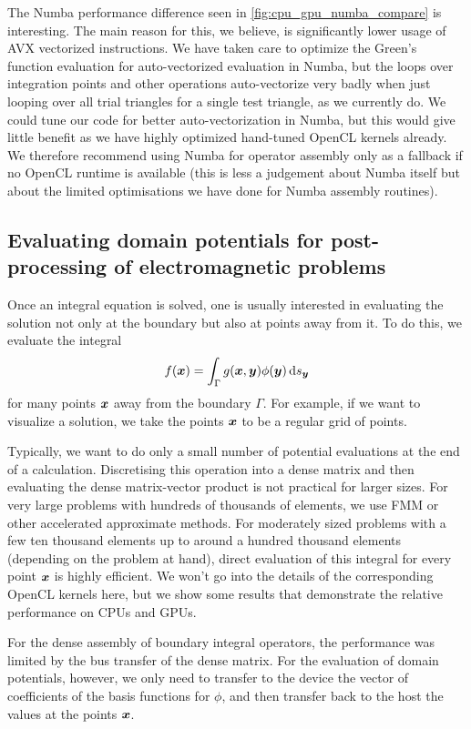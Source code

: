 The Numba performance difference seen in \cref{fig:cpu_gpu_numba_compare} is interesting. The main reason for this, we believe, is significantly lower usage of AVX vectorized instructions. We have taken care to optimize the Green's function evaluation for auto-vectorized evaluation in Numba, but the loops over integration points and other operations auto-vectorize very badly when just looping over all trial triangles for a single test triangle, as we currently do. We could tune our code for better auto-vectorization in Numba, but this would give little benefit as we have highly optimized hand-tuned OpenCL kernels already. We therefore recommend using Numba for operator assembly only as a fallback if no OpenCL runtime is available (this is less a judgement about Numba itself but about the limited optimisations we have done for Numba assembly routines).

\subsection{Evaluating domain potentials for post-processing of electromagnetic problems}
Once an integral equation is solved, one is usually interested in evaluating the solution not only at the boundary but also at points away from it. To do this, we evaluate the integral
$$
f(\bx) = \int_{\Gamma}g(\bx, \by)\phi(\by) \ds[\by]
$$
for many points $\boldsymbol{x}$ away from the boundary $\Gamma$. For example, if we want to visualize a solution, we take the points $\boldsymbol{x}$ to be a regular grid of points.

Typically, we want to do only a small number of potential evaluations at the end of a calculation. Discretising this operation into a dense matrix and then evaluating the dense matrix-vector product is not practical for larger sizes. For very large problems with hundreds of thousands of elements, we use FMM or other accelerated approximate methods. For moderately sized problems with a few ten thousand elements up to around a hundred thousand elements (depending on the problem at hand), direct evaluation of this integral for every point $\boldsymbol{x}$ is highly efficient. We won't go into the details of the corresponding OpenCL kernels here, but we show some results that demonstrate the relative performance on CPUs and GPUs.

For the dense assembly of boundary integral operators, the performance was limited by the bus transfer of the dense matrix. For the evaluation of domain potentials, however, we only need to transfer to the device the vector of coefficients of the basis functions for $\phi$, and then transfer back to the host the values at the points $\boldsymbol{x}$.

